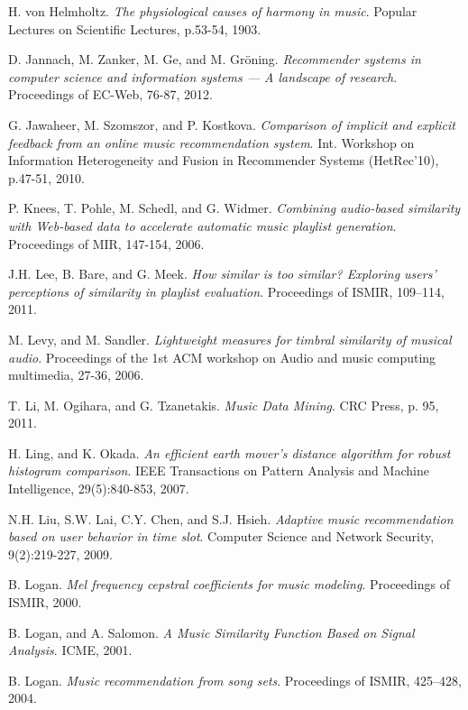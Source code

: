 \documentclass[11pt, oneside, openright]{Thesis} %
\begin{document}
\begin{thebibliography}{99}
H. von Helmholtz.
\textit{The physiological causes of harmony in music}.
Popular Lectures on Scientific Lectures, p.53-54, 1903. 

D. Jannach, M. Zanker, M. Ge, and M. Gr\"{o}ning.
\textit{Recommender systems in computer science and information systems — A landscape of research}.
Proceedings of EC-Web, 76-87, 2012.

G. Jawaheer, M. Szomszor, and P. Kostkova.
\textit{Comparison of implicit and explicit feedback from an online music recommendation system}.
Int. Workshop on Information Heterogeneity and Fusion in Recommender Systems (HetRec'10), p.47-51, 2010.

P. Knees, T. Pohle, M. Schedl, and G. Widmer.
\textit{Combining audio-based similarity with Web-based data to accelerate automatic music playlist generation}.
Proceedings of MIR, 147-154, 2006.

J.H. Lee, B. Bare, and G. Meek. 
\textit{How similar is too similar? Exploring users’ perceptions of similarity in playlist evaluation}. 
Proceedings of ISMIR, 109–114, 2011.

M. Levy, and M. Sandler.
\textit{Lightweight measures for timbral similarity of musical audio}.
Proceedings of the 1st ACM workshop on Audio and music computing multimedia, 27-36, 2006.

T. Li, M. Ogihara, and G. Tzanetakis.
\textit{Music Data Mining}.
CRC Press, p. 95, 2011.

H. Ling, and K. Okada. 
\textit{An efficient earth mover's distance algorithm for robust histogram comparison}.
IEEE Transactions on Pattern Analysis and Machine Intelligence, 29(5):840-853, 2007.

N.H. Liu, S.W. Lai, C.Y. Chen, and S.J. Hsieh.
\textit{Adaptive music recommendation based on user behavior in time slot}.
Computer Science and Network Security, 9(2):219-227, 2009.

B. Logan. 
\textit{Mel frequency cepstral coefficients for music modeling}.
Proceedings of ISMIR, 2000.

B. Logan, and A. Salomon. 
\textit{A Music Similarity Function Based on Signal Analysis}.
ICME, 2001.

B. Logan. 
\textit{Music recommendation from song sets}.
Proceedings of ISMIR, 425–428, 2004.


\end{thebibliography}
\end{document}
